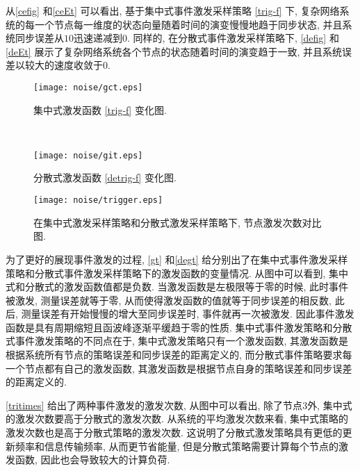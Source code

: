     从\autoref{cefig} 和\autoref{ceEt} 可以看出, 基于集中式事件激发采样策略 \eqref{trig-f} 下, 复杂网络系统的每一个节点每一维度的状态向量随着时间的演变慢慢地趋于同步状态, 并且系统同步误差从$10$迅速递减到$0$. 同样的, 在分散式事件激发采样策略下, \autoref{defig} 和\autoref{deEt} 展示了复杂网络系统各个节点的状态随着时间的演变趋于一致, 并且系统误差以较大的速度收敛于$0$.
    \begin{figure}[!htb]
\begin{minipage}[t]{0.48\linewidth}\centering
\texttt{[image: noise/gct.eps]}\caption{集中式激发函数 \eqref{trig-f} 变化图.}\label{gt}
\end{minipage}~~
\begin{minipage}[t]{0.48\linewidth}\centering
\texttt{[image: noise/git.eps]}\caption{分散式激发函数 \eqref{detrig-f} 变化图.}\label{degt}
\end{minipage}
\end{figure}
\begin{figure}[!htb]
\begin{minipage}[t]{0.48\linewidth}\centering
\texttt{[image: noise/trigger.eps]}\caption{在集中式激发采样策略和分散式激发采样策略下, 节点激发次数对比图.}\label{tritimes}
\end{minipage}
\end{figure}

    为了更好的展现事件激发的过程, \autoref{gt} 和\autoref{degt} 给分别出了在集中式事件激发采样策略和分散式事件激发采样策略下的激发函数的变量情况. 从图中可以看到, 集中式和分散式的激发函数值都是负数. 当激发函数是左极限等于零的时候, 此时事件被激发, 测量误差就等于零, 从而使得激发函数的值就等于同步误差的相反数, 此后, 测量误差有开始慢慢的增大至同步误差时, 事件就再一次被激发. 因此事件激发函数是具有周期缩短且函波峰逐渐平缓趋于零的性质. 集中式事件激发策略和分散式事件激发策略的不同点在于, 集中式激发策略只有一个激发函数, 其激发函数是根据系统所有节点的策略误差和同步误差的距离定义的, 而分散式事件策略要求每一个节点都有自己的激发函数, 其激发函数是根据节点自身的策略误差和同步误差的距离定义的.

    \autoref{tritimes} 给出了两种事件激发的激发次数, 从图中可以看出, 除了节点$3$外, 集中式的激发次数要高于分散式的激发次数. 从系统的平均激发次数来看, 集中式策略的激发次数也是高于分散式策略的激发次数. 这说明了分散式激发策略具有更低的更新频率和信息传输频率, 从而更节省能量, 但是分散式策略需要计算每个节点的激发函数, 因此也会导致较大的计算负荷.

